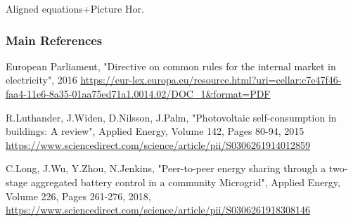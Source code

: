 \documentclass[xcolor=dvipsnames,aspectratio=169]{beamer} %
\begin{document}
{{\begin{frame}[noframenumbering]{Aligned equations+Picture Hor.}
\begin{minipage}{0.4\paperwidth}
\end{minipage}
\begin{minipage}{0.5\paperwidth}


\end{minipage}

\end{frame}


\begin{frame}[noframenumbering]

\frametitle{Main References}

\begin{minipage}{0.9\paperwidth}

\vspace{-24pt}

\begin{thebibliography}{00}

\footnotesize

 European Parliament, "Directive on common rules for the internal market in electricity", 2016 \url{https://eur-lex.europa.eu/resource.html?uri=cellar:c7e47f46-faa4-11e6-8a35-01aa75ed71a1.0014.02/DOC_1&format=PDF}

 R.Luthander, J.Widen, D.Nilsson, J.Palm, "Photovoltaic self-consumption in buildings: A review", Applied Energy, Volume 142, Pages 80-94, 2015 \url{https://www.sciencedirect.com/science/article/pii/S0306261914012859}

 C.Long, J.Wu, Y.Zhou, N.Jenkins, "Peer-to-peer energy sharing through a two-stage aggregated battery control in a community Microgrid", Applied Energy, Volume 226,
Pages 261-276, 2018, \url{https://www.sciencedirect.com/science/article/pii/S0306261918308146}


\end{thebibliography}
\end{minipage}
\end{frame}}}
\end{document}
